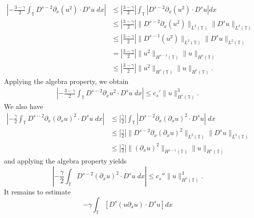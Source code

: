 \documentclass[12pt,reqno]{amsart}
\newcommand{\p}{\partial}
\newcommand{\ci}{\mathbb{T}}
\theoremstyle{plain}  %
\theoremstyle{definition}
\begin{document}
\begin{appendices}
\begin{equation}
		\begin{split}
			\left | - \frac{3 -\gamma}{2} \int_\ci D^{s-2} \p_x (u^2) \cdot
			D^s u \; dx \right |
			& \le \left | \frac{3 -\gamma}{2} \right |
			\int_\ci \left |
			D^{s-2} \p_x (u^2) \cdot D^s u \right | dx 
			\\
			& \le \left | \frac{3 -\gamma}{2} \right |
			\|D^{s-2} \p_x (u^2) \|_{L^2(\ci)} 
			\|D^s u \|_{L^2(\ci)}
			\\
			& \le \left | \frac{3 -\gamma}{2} \right |
			\|D^{s-1} (u^2) \|_{L^2(\ci)} 
			\|D^s u \|_{L^2(\ci)}
			\\
			& = \left | \frac{3 -\gamma}{2} \right |
			\| u^2 \|_{H^{s-1}(\ci)} \| u \|_{H^s(\ci)}
			\\
			& \le
			\left | \frac{3 -\gamma}{2} \right | \| u^2 \|_{H^s(\ci)} \| u
			\|_{H^s(\ci)}.
		\end{split}
	\end{equation}
	Applying the algebra property, we obtain
	\begin{equation}
		\label{hl1-prime}
		\begin{split}
			\left | -\frac{3 -\gamma}{2} \int_\ci D^{s-2} \p_x u^2 \cdot
			D^s u \; dx \right |
			\le c_s' \| u \|_{H^s(\ci)}^3.
		\end{split}
	\end{equation}
	We also have
	\begin{equation}
		\begin{split}
			\left | -\frac{\gamma}{2} \int_\ci D^{s-2} \p_x (\p_x u)^2 \cdot
			D^s u \; dx \right |
			& \le \left | \frac{\gamma}{2} \right |
			\int_\ci \left | D^{s-2} \p_x (\p_x u)^2 
			\cdot D^s u \right | \; dx
			\\
			& \le \left | \frac{\gamma}{2} \right |
			\| D^{s-2} \p_x (\p_x u)^2 \|_{L^2(\ci)}
			\| D^s u \|_{L^2(\ci)}
			\\
			&  \le \left | \frac{\gamma}{2} \right | \|(\p_x u)^2
			\|_{H^{s-1}(\ci)} \| u \|_{H^s(\ci)} 
		\end{split}
	\end{equation}
	and applying the algebra property yields
	\begin{equation}
		\label{hl2-prime}
		\left | -\frac{\gamma}{2} \int_\ci D^{s-2} (\p_x u)^2 \cdot
		D^s u \; dx \right |
		\le c_s'' \|u\|_{H^s(\ci)}^3.
	\end{equation}
	It remains to estimate 
	\begin{equation*}
		- \gamma \int_{\ci} \left [  D^s (u \p_x u) \cdot
		D^s u \right ]  dx
	\end{equation*}

\end{appendices}
\end{document}
